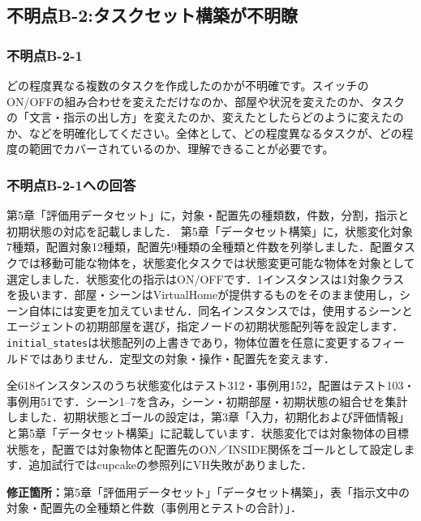\documentclass{jsarticle}
\begin{document}
\subsection*{不明点B-2:タスクセット構築が不明瞭}
\subsubsection*{不明点B-2-1}
\begin{screen}
どの程度異なる複数のタスクを作成したのかが不明確です。スイッチのON/OFFの組み合わせを変えただけなのか、部屋や状況を変えたのか、タスクの「文言・指示の出し方」を変えたのか、変えたとしたらどのように変えたのか、などを明確化してください。全体として、どの程度異なるタスクが、どの程度の範囲でカバーされているのか、理解できることが必要です。
\end{screen}

\subsubsection*{不明点B-2-1への回答}
第5章「評価用データセット」に，対象・配置先の種類数，件数，分割，指示と初期状態の対応を記載しました．
第5章「データセット構築」に，状態変化対象7種類，配置対象12種類，配置先9種類の全種類と件数を列挙しました．配置タスクでは移動可能な物体を，状態変化タスクでは状態変更可能な物体を対象として選定しました．状態変化の指示はON/OFFです．1インスタンスは1対象クラスを扱います．部屋・シーンはVirtualHomeが提供するものをそのまま使用し，シーン自体には変更を加えていません．同名インスタンスでは，使用するシーンとエージェントの初期部屋を選び，指定ノードの初期状態配列等を設定します．\texttt{initial\_states}は状態配列の上書きであり，物体位置を任意に変更するフィールドではありません．定型文の対象・操作・配置先を変えます．

全618インスタンスのうち状態変化はテスト312・事例用152，配置はテスト103・事例用51です．シーン1--7を含み，シーン・初期部屋・初期状態の組合せを集計しました．初期状態とゴールの設定は，第3章「入力，初期化および評価情報」と第5章「データセット構築」に記載しています．状態変化では対象物体の目標状態を，配置では対象物体と配置先のON／INSIDE関係をゴールとして設定します．追加試行ではcupcakeの参照列にVH失敗がありました．

\noindent\textbf{修正箇所：}第5章「評価用データセット」「データセット構築」，表「指示文中の対象・配置先の全種類と件数（事例用とテストの合計）」．
\end{document}
